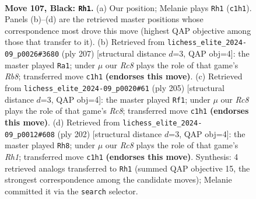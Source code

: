 \documentclass[11pt]{article}
\begin{document}
\clearpage

\begin{figure}[p]\centering
\begin{subfigure}{0.46\textwidth}\centering
\resizebox{\linewidth}{!}{%
\newchessgame
\chessboard[
  setfen={8/5k2/8/8/8/r7/4RK2/2r5 b - - 25 107},
  showmover=false,
  pgfstyle=straightmove, color=movearrow, markmove={c1-h1}
]}
\caption{}
\end{subfigure}\hfill
\begin{subfigure}{0.46\textwidth}\centering
\resizebox{\linewidth}{!}{%
\newchessgame
\chessboard[
  setfen={8/8/8/8/3k4/8/4RK2/1r6 b - - 60 104},
  showmover=false,
  pgfstyle=straightmove, color=movearrow, markmove={b1-a1}
]}
\caption{}
\end{subfigure}
\\[4pt]
\begin{subfigure}{0.46\textwidth}\centering
\resizebox{\linewidth}{!}{%
\newchessgame
\chessboard[
  setfen={8/8/8/1K1k4/1R6/8/8/2r5 b - - 79 103},
  showmover=false,
  pgfstyle=straightmove, color=movearrow, markmove={c1-f1}
]}
\caption{}
\end{subfigure}\hfill
\begin{subfigure}{0.46\textwidth}\centering
\resizebox{\linewidth}{!}{%
\newchessgame
\chessboard[
  setfen={8/8/2K5/5rk1/8/8/8/7R w - - 90 102},
  showmover=false,
  pgfstyle=straightmove, color=movearrow, markmove={h1-h8}
]}
\caption{}
\end{subfigure}
\caption{\textbf{Move 107, Black: \texttt{Rh1}.} (a) Our position; Melanie plays \texttt{Rh1} (\texttt{c1h1}). Panels (b)--(d) are the retrieved master positions whose correspondence most drove this move (highest QAP objective among those that transfer to it). (b) Retrieved from \texttt{lichess\_elite\_2024-09\_p0026\#3680} (ply 207) [structural distance $d$=3, QAP obj=4]: the master played \texttt{Ra1}; under $\mu$ our \emph{Rc8} plays the role of that game's \emph{Rb8}; transferred move \texttt{c1h1} \textbf{(endorses this move)}. (c) Retrieved from \texttt{lichess\_elite\_2024-09\_p0020\#61} (ply 205) [structural distance $d$=3, QAP obj=4]: the master played \texttt{Rf1}; under $\mu$ our \emph{Rc8} plays the role of that game's \emph{Rc8}; transferred move \texttt{c1h1} \textbf{(endorses this move)}. (d) Retrieved from \texttt{lichess\_elite\_2024-09\_p0012\#608} (ply 202) [structural distance $d$=3, QAP obj=4]: the master played \texttt{Rh8}; under $\mu$ our \emph{Rc8} plays the role of that game's \emph{Rh1}; transferred move \texttt{c1h1} \textbf{(endorses this move)}. Synthesis: 4 retrieved analogs transferred to \texttt{Rh1} (summed QAP objective 15, the strongest correspondence among the candidate moves); Melanie committed it via the \texttt{search} selector.}
\label{fig:thought-m213}
\end{figure}
\end{document}
